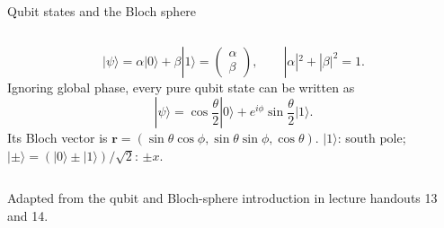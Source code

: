 \begin{frame}{Qubit states and the Bloch sphere}
  \begin{columns}[c]
    \[
      |\psi\rangle=\alpha|0\rangle+\beta|1\rangle
      =\begin{pmatrix}\alpha\\\beta\end{pmatrix},
      \qquad |\alpha|^2+|\beta|^2=1.
    \]
    Ignoring global phase, every pure qubit state can be written as
    \[
      |\psi\rangle=\cos\frac{\theta}{2}|0\rangle
      +e^{i\phi}\sin\frac{\theta}{2}|1\rangle.
    \]
    Its Bloch vector is
    $\mathbf r=(\sin\theta\cos\phi,\sin\theta\sin\phi,\cos\theta)$.
    \centering
    \vspace{0.3em}
    \small $|1\rangle$: south pole; $|\pm\rangle=(|0\rangle\pm|1\rangle)/\sqrt2$: $\pm x$.
  \end{columns}
  \vfill\tiny Adapted from the qubit and Bloch-sphere introduction in lecture handouts 13 and 14.
\end{frame}

